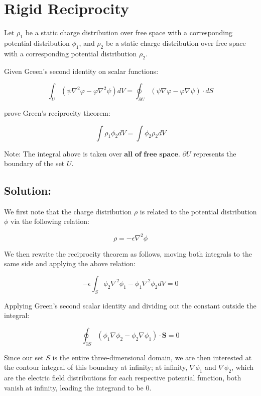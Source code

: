 \documentclass{article}
\begin{document}
\newpage

\section{Rigid Reciprocity}

Let $\rho_1$ be a static charge distribution over free space with a corresponding potential distribution $\phi_1$, and $\rho_2$ be a static charge distribution over free space with a corresponding potential distribution $\rho_2$. 

\vspace{3mm}

Given Green's second identity on scalar functions:

\[
\int_U (\psi\nabla^2\varphi - \varphi\nabla^2\psi) dV = \oint_{\partial U}(\psi\nabla\varphi - \varphi\nabla\psi)\cdot dS
\]

prove Green's reciprocity theorem:

\[
\int \rho_1\phi_2 dV = \int \phi_2\rho_2 dV
\]

Note: The integral above is taken over $\textbf{all of free space}$. $\partial U$ represents the boundary of the set $U$.

\subsection{Solution:}

We first note that the charge distribution $\rho$ is related to the potential distribution $\phi$ via the following relation:

\[
\rho = -\epsilon\nabla^2 \phi
\]

We then rewrite the reciprocity theorem as follows, moving both integrals to the same side and applying the above relation:

\[
-\epsilon \int_S \phi_2\nabla^2\phi_1 - \phi_1\nabla^2\phi_2 dV = 0
\]

Applying Green's second scalar identity and dividing out the constant outside the integral:

\[
\oint_{\partial S} (\phi_1\nabla\phi_2 - \phi_2\nabla\phi_1)\cdot\textbf{S} = 0
\]

Since our set $S$ is the entire three-dimensional domain, we are then interested at the contour integral of this boundary at infinity; at infinity, $\nabla\phi_1$ and $\nabla\phi_2$, which are the electric field distributions for each respective potential function, both vanish at infinity, leading the integrand to be 0. 
\end{document}
